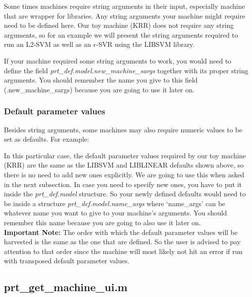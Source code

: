 Some times machines require string arguments in their input, especially machine that are wrapper for libraries. Any string arguments your machine might require need to be defined here. Our toy machine (KRR) does not require any string arguments, so for an example we will present the string arguments required to run an L2-SVM as well as an $\epsilon$-SVR using the LIBSVM library.



If your machine required some string arguments to work, you would need to define the field \textit{prt\_def.model.new\_machine\_sargs} together with its proper string arguments. You should remember the name you give to this field (.new\_machine\_sargs) because you are going to use it later on.

\subsubsection{Default parameter values}
\label{sssec:def_param_values}

Besides string arguments, some machines may also require numeric values to be set as defaults. For example:



In this particular case, the default parameter values required by our toy machine (KRR) are the same as the LIBSVM and LIBLINEAR defaults shown above, so there is no need to add new ones explicitly. We are going to use this when asked in the next subsection. In case you need to specify new ones, you have to put it inside the \textit{prt\_def.model} structure. So your newly defined defaults would need to be inside a structure \textit{prt\_def.model.name\_args} where `name\_args' can be whatever name you want to give to your machine's arguments. You should remember this name because you are going to also use it later on.
\\

\noindent \textbf{Important Note:} The order with which the default parameter values will be harvested is the same as the one that are defined. So the user is advised to pay attention to that order since the machine will most likely not hit an error if run with transposed default parameter values.


\subsection{prt\_get\_machine\_ui.m}

